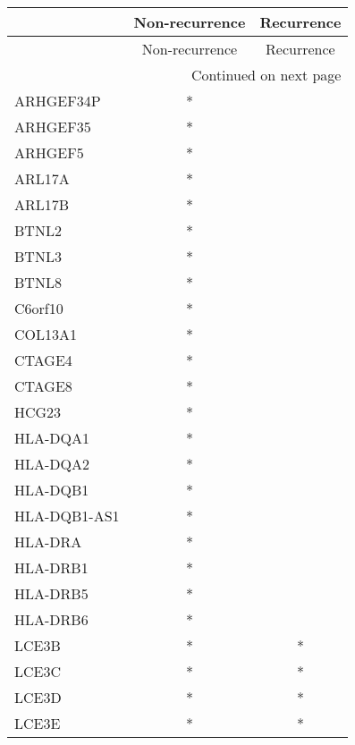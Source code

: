 \begin{longtable}{lcc}
\toprule
{} & Non-recurrence & Recurrence \\
\midrule
\endfirsthead

\toprule
{} & Non-recurrence & Recurrence \\
\midrule
\endhead
\midrule
\multicolumn{3}{r}{{Continued on next page}} \\
\midrule
\endfoot

\bottomrule
\endlastfoot
ARHGEF34P    &              * &            \\
ARHGEF35     &              * &            \\
ARHGEF5      &              * &            \\
ARL17A       &              * &            \\
ARL17B       &              * &            \\
BTNL2        &              * &            \\
BTNL3        &              * &            \\
BTNL8        &              * &            \\
C6orf10      &              * &            \\
COL13A1      &              * &            \\
CTAGE4       &              * &            \\
CTAGE8       &              * &            \\
HCG23        &              * &            \\
HLA-DQA1     &              * &            \\
HLA-DQA2     &              * &            \\
HLA-DQB1     &              * &            \\
HLA-DQB1-AS1 &              * &            \\
HLA-DRA      &              * &            \\
HLA-DRB1     &              * &            \\
HLA-DRB5     &              * &            \\
HLA-DRB6     &              * &            \\
LCE3B        &              * &          * \\
LCE3C        &              * &          * \\
LCE3D        &              * &          * \\
LCE3E        &              * &          * \\

\end{longtable}
